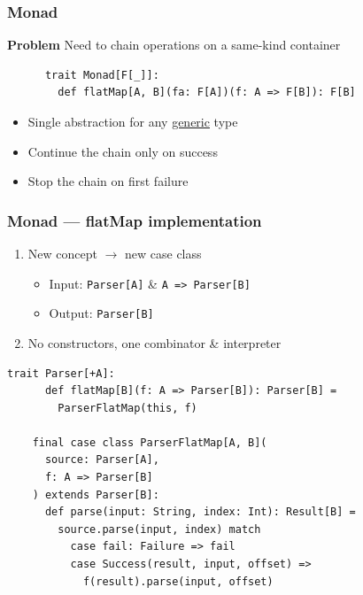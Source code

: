 \begin{frame}[fragile]
  \frametitle{Monad}

  \textbf{Problem} Need to chain operations on a same-kind container

  \begin{definition}
    \begin{lstlisting}
      trait Monad[F[_]]:
        def flatMap[A, B](fa: F[A])(f: A => F[B]): F[B]
    \end{lstlisting}
  \end{definition}

  \begin{itemize}
    \item Single abstraction for any \ul{generic} type
    \item Continue the chain only on success
    \item Stop the chain on first failure
  \end{itemize}
\end{frame}

\begin{frame}[fragile]
  \frametitle{Monad --- flatMap implementation}

  \begin{enumerate}
    \item New concept \({\rightarrow}\) new case class
          \begin{itemize}
            \item Input: \texttt{Parser[A]} \& \texttt{A => Parser[B]}
            \item Output: \texttt{Parser[B]}
          \end{itemize}
    \item No constructors, one combinator \& interpreter
  \end{enumerate}

  \begin{lstlisting}[gobble=4]
    trait Parser[+A]:
      def flatMap[B](f: A => Parser[B]): Parser[B] =
        ParserFlatMap(this, f)

    final case class ParserFlatMap[A, B](
      source: Parser[A],
      f: A => Parser[B]
    ) extends Parser[B]:
      def parse(input: String, index: Int): Result[B] =
        source.parse(input, index) match
          case fail: Failure => fail
          case Success(result, input, offset) =>
            f(result).parse(input, offset)
  \end{lstlisting}

\end{frame}

